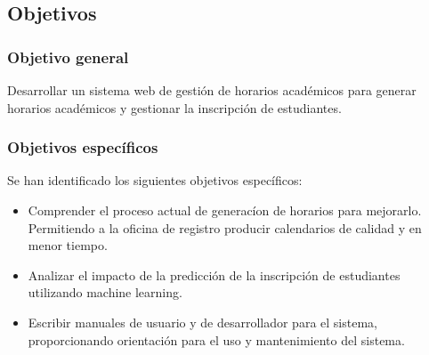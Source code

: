 \subsection{Objetivos}
\label{sec:objectives}

\subsubsection{Objetivo general}
Desarrollar un sistema web de gestión de horarios académicos para generar horarios académicos y gestionar la inscripción de estudiantes.

\subsubsection{Objetivos específicos}
Se han identificado los siguientes objetivos específicos:
\begin{itemize}
    \item Comprender el proceso actual de generacíon de horarios para mejorarlo.
    Permitiendo a la oficina de registro producir calendarios de calidad y en menor tiempo.
    \item Analizar el impacto de la predicción de la inscripción de estudiantes utilizando machine learning.
    \item Escribir manuales de usuario y de desarrollador para el sistema, proporcionando orientación para el uso y mantenimiento del sistema.
\end{itemize}


